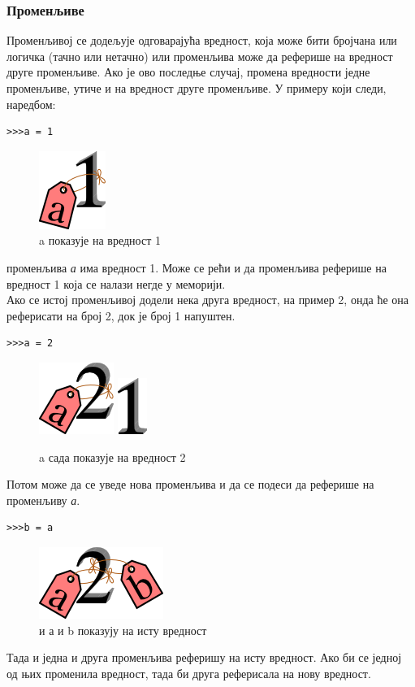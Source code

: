 \documentclass[11pt, serbianc, english, titlepage]{article}
\begin{document}
		\subsubsection{Променљиве}
		Променљивој се додељује одговарајућа вредност, која може бити бројчана или логичка (тачно или нетачно) или променљива може да реферише на вредност друге променљиве. Ако је ово последње случај, промена вредности једне променљиве, утиче и на вредност друге променљиве. У примеру који следи, наредбом:
		\begin{lstlisting}
>>>a = 1
		\end{lstlisting}
		\begin{figure}[here]
		\centering
		\includegraphics{1a.png}
		\caption{a показује на вредност 1}
		\label{slike:a_je_1}
		\end{figure}
		променљива \emph{а} има вредност 1. Може се рећи и да променљива реферише на вредност 1 која се налази негде у меморији.\\
		Ако се истој променљивој додели нека друга вредност, на пример 2, онда ће она реферисати на број 2, док је број 1 напуштен.
		\begin{lstlisting}
>>>a = 2
		\end{lstlisting}
		\begin{figure}[here]
		\centering
		\includegraphics{2a.png}
		\includegraphics{1.png}
		\caption{a сада показује на вредност 2}
		\label{slike:a_je_2}
		\end{figure}
		
		Потом може да се уведе нова променљива и да се подеси да реферише на променљиву \emph{а}.
		\begin{lstlisting}
>>>b = a
		\end{lstlisting}
		\begin{figure} [here]
		\centering	
		\includegraphics{2ab.png}
		\caption{и а и b показују на исту вредност}
		\label{slike:a_b_je_2}
		\end{figure}
		Тада и једна и друга променљива реферишу на исту вредност. Ако би се једној од њих променила вредност, тада би друга реферисала на нову вредност.\\
		
\end{document}
